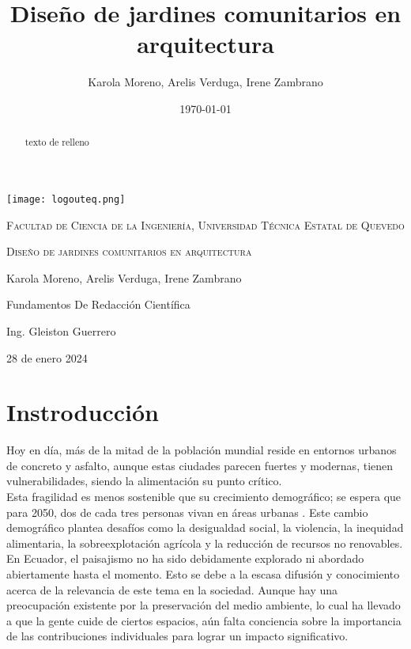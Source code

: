 \documentclass[12pt]{article}
\title{Diseño  de jardines comunitarios en arquitectura}
\author{Karola Moreno, Arelis Verduga,  Irene Zambrano}
\date{\today}
\begin{document}
\begin{titlepage}
	\centering
	{\texttt{[image: logouteq.png]}\par}
	\vspace{1cm}
	{\large \textsc{Facultad de Ciencia de la Ingeniería, Universidad Técnica Estatal de Quevedo}\par}
	\vfill
	{\large \textsc{Diseño  de jardines comunitarios en arquitectura}\par}
	\vfill
	{\large Karola Moreno, Arelis Verduga, Irene Zambrano \par}
	\vspace{1cm}
	{\large Fundamentos De Redacción Científica \par}
	\vspace{1cm}
	{\large Ing. Gleiston Guerrero \par}
    \vfill
    {\large 28 de enero 2024}
\end{titlepage}
\begin{abstract}
texto de relleno

\end{abstract}
\newpage

\section{Instroducción}
Hoy en día, más de la mitad de la población mundial reside en entornos urbanos de concreto y asfalto, aunque estas ciudades parecen fuertes y modernas, tienen vulnerabilidades, siendo la alimentación su punto crítico. \\
Esta fragilidad es menos sostenible que su crecimiento demográfico; se espera que para 2050, dos de cada tres personas vivan en áreas urbanas \textcite{martinezvargas0}. Este cambio demográfico plantea desafíos como la desigualdad social, la violencia, la inequidad alimentaria, la sobreexplotación agrícola y la reducción de recursos no renovables. \\

En Ecuador, el paisajismo no ha sido debidamente explorado ni abordado abiertamente hasta el momento. Esto se debe a la escasa difusión y conocimiento acerca de la relevancia de este tema en la sociedad. Aunque hay una preocupación existente por la preservación del medio ambiente, lo cual ha llevado a que la gente cuide de ciertos espacios, aún falta conciencia sobre la importancia de las contribuciones individuales para lograr un impacto significativo. \\
\end{document}
